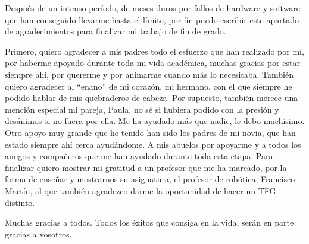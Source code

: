 \documentclass[twoside,a4paper,12pt,openany]{book}
\begin{document}
Después de un intenso período, de meses duros por fallos de hardware y software que han conseguido llevarme hasta el límite, por fin puedo escribir este apartado de agradecimientos para finalizar mi trabajo de fin de grado.

Primero, quiero agradecer a mis padres todo el esfuerzo que han realizado por mí, por haberme apoyado durante toda mi vida académica, muchas gracias por estar siempre ahí, por quererme y por animarme cuando más lo necesitaba.
También quiero agradecer al ``enano'' de mi corazón, mi hermano, con el que siempre he podido hablar de mis quebraderos de cabeza.
Por supuesto, también merece una mención especial mi pareja, Paula, no sé si hubiera podido con la presión y desánimos si no fuera por ella. Me ha ayudado más que nadie, le debo muchísimo.
Otro apoyo muy grande que he tenido han sido los padres de mi novia, que han estado siempre ahí cerca ayudándome.
A mis abuelos por apoyarme y a todos los amigos y compañeros que me han ayudado durante toda esta etapa.
Para finalizar quiero mostrar mi gratitud a un profesor que me ha marcado, por la forma de enseñar y mostrarnos su asignatura, el profesor de robótica, Francisco Martín, al que también agradezco darme la oportunidad de hacer un TFG distinto.

Muchas gracias a todos. Todos los éxitos que consiga en la vida, serán en parte gracias a vosotros.

\clearpage
\newpage{\pagestyle{empty}\cleardoublepage}

\newpage{\pagestyle{empty}\cleardoublepage} 
%


\frontmatter
\tableofcontents

\listoffigures

\mainmatter

\setcounter{page}{1}
















\end{document}
